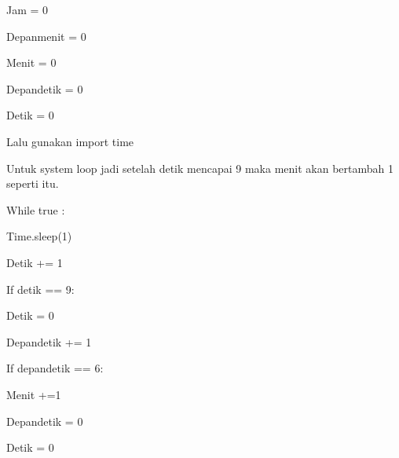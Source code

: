 \noindent 
{\fontsize{14pt}{14pt}\selectfont Jam = 0 \\} \par
\noindent 
{\fontsize{14pt}{14pt}\selectfont Depanmenit = 0 \\} \par
\noindent 
{\fontsize{14pt}{14pt}\selectfont Menit = 0 \\} \par
\noindent 
{\fontsize{14pt}{14pt}\selectfont Depandetik = 0 \\} \par
\noindent 
{\fontsize{14pt}{14pt}\selectfont Detik = 0 \\} \par
\noindent 
{\fontsize{14pt}{14pt}\selectfont  Lalu gunakan import time \\} \par
\noindent 
{\fontsize{14pt}{14pt}\selectfont Untuk system loop jadi setelah detik mencapai 9 maka menit akan bertambah 1 seperti itu. \\} \par
\vspace{14pt}
\noindent 
{\fontsize{14pt}{14pt}\selectfont While true : \\} \par
\noindent 
{\fontsize{14pt}{14pt}\selectfont Time.sleep(1) \\} \par
\noindent 
{\fontsize{14pt}{14pt}\selectfont Detik += 1 \\} \par
\noindent 
{\fontsize{14pt}{14pt}\selectfont If detik == 9: \\} \par
\noindent 
{\fontsize{14pt}{14pt}\selectfont Detik = 0 \\} \par
\noindent 
{\fontsize{14pt}{14pt}\selectfont Depandetik += 1 \\} \par
\noindent 
{\fontsize{14pt}{14pt}\selectfont If depandetik == 6: \\} \par
\noindent 
{\fontsize{14pt}{14pt}\selectfont Menit +=1 \\} \par
\noindent 
{\fontsize{14pt}{14pt}\selectfont Depandetik = 0 \\} \par
\noindent 
{\fontsize{14pt}{14pt}\selectfont Detik = 0 \\} \par
